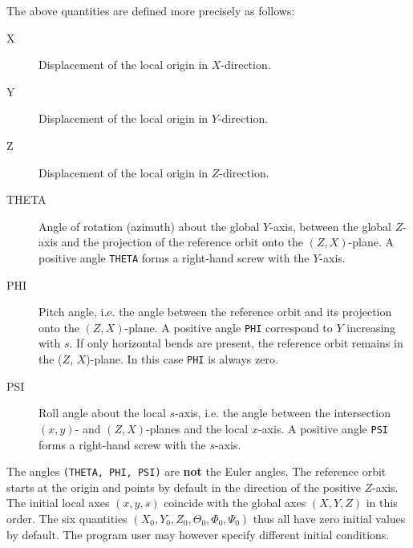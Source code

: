 The above quantities are defined more precisely as follows:
\begin{description}
\item[X]
  Displacement of the local origin in $X$-direction.
\item[Y]
  Displacement of the local origin in $Y$-direction.
\item[Z]
  Displacement of the local origin in $Z$-direction.
\item[THETA]
  Angle of rotation (azimuth) about the global $Y$-axis,
  between the global $Z$-axis and the projection
  of the reference orbit onto the $(Z, X)$-plane.
  A positive angle \texttt{THETA} forms a right-hand screw with the $Y$-axis.
\item[PHI]
  Pitch angle, i.e. the angle between the reference orbit and its projection
  onto the $(Z, X)$-plane.
  A positive angle \texttt{PHI} correspond to $Y$ increasing with $s$.
  If only horizontal bends are present,
  the reference orbit remains in the ($Z$, $X$)-plane.
  In this case \texttt{PHI} is always zero.
\item[PSI]
  Roll angle about the local $s$-axis,
  i.e. the angle between the intersection $(x, y)$- and
  $(Z, X)$-planes and the local $x$-axis.
  A positive angle \texttt{PSI} forms a right-hand screw with the $s$-axis.
\end{description}
The angles \texttt{(THETA, PHI, PSI)} are \textbf{not} the Euler angles.
The reference orbit starts at the origin and points by default
in the direction of the positive $Z$-axis.
The initial local axes $(x, y, s)$ 
coincide with the global axes $(X, Y, Z)$ in this order.
The six quantities $(X_0, Y_0, Z_0, \Theta_0, \Phi_0, \Psi_0)$
thus all have zero initial values by default.
The program user may however specify different initial conditions.

